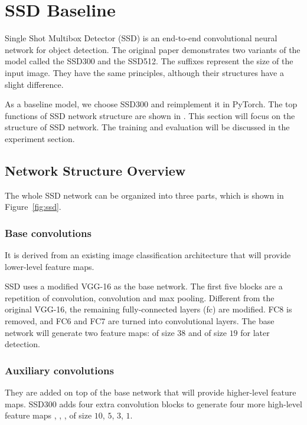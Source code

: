 \documentclass[journal,conference]{IEEEtran}
\begin{document}
\section{SSD Baseline}
Single Shot Multibox Detector (SSD) is an end-to-end convolutional neural network for object detection. The original paper \cite{ssd} demonstrates two variants of the model called the SSD300 and the SSD512. The suffixes represent the size of the input image. They have the same principles, although their structures have a slight difference.

As a baseline model, we choose SSD300 and reimplement it in PyTorch. The top functions of SSD network structure are shown in . This section will focus on the structure of SSD network. The training and evaluation will be discussed in the experiment section.


\subsection{Network Structure Overview}
The whole SSD network can be organized into three parts, which is shown in Figure~\ref{fig:ssd}.

\subsubsection{Base convolutions}
It is derived from an existing image classification architecture that will provide lower-level feature maps.

SSD uses a modified VGG-16 as the base network. The first five blocks are a repetition of convolution, convolution and max pooling. Different from the original VGG-16, the remaining fully-connected layers (fc) are modified. FC8 is removed, and FC6 and FC7 are turned into convolutional layers. The base network will generate two feature maps:  of size $38$ and  of size $19$ for later detection.

\subsubsection{Auxiliary convolutions}
They are added on top of the base network that will provide higher-level feature maps. SSD300 adds four extra convolution blocks to generate four more high-level feature maps , , ,  of size $10$, $5$, $3$, $1$.
\end{document}
